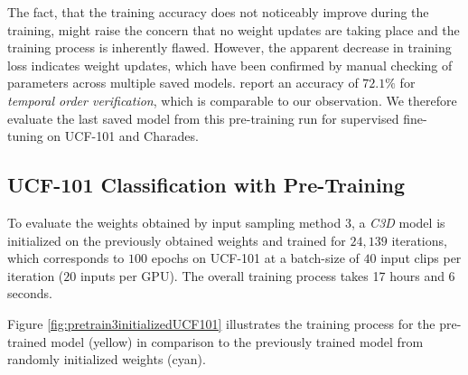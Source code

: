 The fact, that the training accuracy does not noticeably improve during the training, might raise the concern that no weight updates are taking place and the training process is inherently flawed.
However, the apparent decrease in training loss indicates weight updates, which have been confirmed by manual checking of parameters across multiple saved models.
\textcite{misra_shuffle_2016} report an accuracy of $72.1\%$ for \textit{temporal order verification}, which is comparable to our observation.
We therefore evaluate the last saved model from this pre-training run for supervised fine-tuning on UCF-101 and Charades.

\subsection{UCF-101 Classification with Pre-Training}
To evaluate the weights obtained by input sampling method 3, a \textit{C3D} model is initialized on the previously obtained weights and trained for $24,139$ iterations, which corresponds to $100$ epochs on UCF-101 at a batch-size of $40$ input clips per iteration ($20$ inputs per GPU).
The overall training process takes 17 hours and 6 seconds. 

Figure \ref{fig:pretrain3initializedUCF101} illustrates the training process for the pre-trained model (yellow) in comparison to the previously trained model from randomly initialized weights (cyan).

